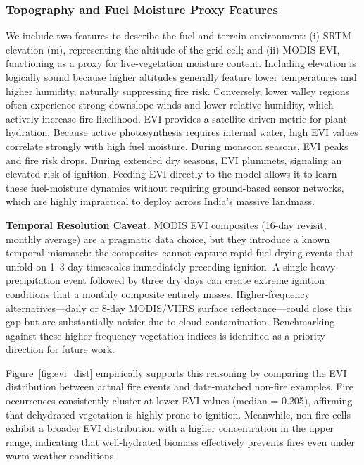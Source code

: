 \documentclass[11pt]{article}
\begin{document}
\subsubsection{Topography and Fuel Moisture Proxy Features}

We include two features to describe the fuel and terrain environment: (i) SRTM elevation (m), representing the altitude of the grid cell; and (ii) MODIS EVI, functioning as a proxy for live-vegetation moisture content. Including elevation is logically sound because higher altitudes generally feature lower temperatures and higher humidity, naturally suppressing fire risk. Conversely, lower valley regions often experience strong downslope winds and lower relative humidity, which actively increase fire likelihood. EVI provides a satellite-driven metric for plant hydration. Because active photosynthesis requires internal water, high EVI values correlate strongly with high fuel moisture. During monsoon seasons, EVI peaks and fire risk drops. During extended dry seasons, EVI plummets, signaling an elevated risk of ignition. Feeding EVI directly to the model allows it to learn these fuel-moisture dynamics without requiring ground-based sensor networks, which are highly impractical to deploy across India's massive landmass.

\medskip
\noindent\textbf{Temporal Resolution Caveat.} MODIS EVI composites (16-day revisit, monthly average) are a pragmatic data choice, but they introduce a known temporal mismatch: the composites cannot capture rapid fuel-drying events that unfold on 1--3 day timescales immediately preceding ignition. A single heavy precipitation event followed by three dry days can create extreme ignition conditions that a monthly composite entirely misses. Higher-frequency alternatives---daily or 8-day MODIS/VIIRS surface reflectance---could close this gap but are substantially noisier due to cloud contamination. Benchmarking against these higher-frequency vegetation indices is identified as a priority direction for future work.

Figure~\ref{fig:evi_dist} empirically supports this reasoning by comparing the EVI distribution between actual fire events and date-matched non-fire examples. Fire occurrences consistently cluster at lower EVI values (median = 0.205), affirming that dehydrated vegetation is highly prone to ignition. Meanwhile, non-fire cells exhibit a broader EVI distribution with a higher concentration in the upper range, indicating that well-hydrated biomass effectively prevents fires even under warm weather conditions.
\end{document}
